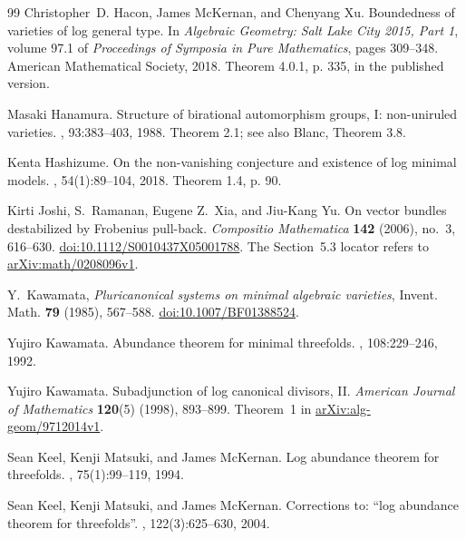 \begin{thebibliography}{99}
Christopher~D. Hacon, James McKernan, and Chenyang Xu.
\newblock Boundedness of varieties of log general type.
\newblock In {\em Algebraic Geometry: Salt Lake City 2015, Part 1}, volume 97.1 of {\em Proceedings of Symposia in Pure Mathematics}, pages 309--348. American Mathematical Society, 2018.
\newblock Theorem 4.0.1, p. 335, in the published version.

Masaki Hanamura.
\newblock Structure of birational automorphism groups, {I}: non-uniruled varieties.
, 93:383--403, 1988.
\newblock Theorem 2.1; see also Blanc, Theorem 3.8.

Kenta Hashizume.
\newblock On the non-vanishing conjecture and existence of log minimal models.
, 54(1):89--104, 2018.
\newblock Theorem 1.4, p. 90.

Kirti Joshi, S.~Ramanan, Eugene Z.~Xia, and Jiu-Kang Yu.
\newblock On vector bundles destabilized by Frobenius pull-back.
\newblock \emph{Compositio Mathematica} \textbf{142} (2006),
no.~3, 616--630.
\newblock \href{https://doi.org/10.1112/S0010437X05001788}{doi:10.1112/S0010437X05001788}.
\newblock The Section~5.3 locator refers to
\href{https://arxiv.org/abs/math/0208096v1}{arXiv:math/0208096v1}.

Y.~Kawamata,
\emph{Pluricanonical systems on minimal algebraic varieties},
Invent. Math. \textbf{79} (1985), 567--588.
\href{https://doi.org/10.1007/BF01388524}{doi:10.1007/BF01388524}.

Yujiro Kawamata.
\newblock Abundance theorem for minimal threefolds.
, 108:229--246, 1992.

Yujiro Kawamata.
\newblock Subadjunction of log canonical divisors, II.
\newblock \emph{American Journal of Mathematics} \textbf{120}(5) (1998), 893--899.
\newblock Theorem~1 in \href{https://arxiv.org/abs/alg-geom/9712014v1}{arXiv:alg-geom/9712014v1}.

Sean Keel, Kenji Matsuki, and James McKernan.
\newblock Log abundance theorem for threefolds.
, 75(1):99--119, 1994.

Sean Keel, Kenji Matsuki, and James McKernan.
\newblock Corrections to: ``log abundance theorem for threefolds''.
, 122(3):625--630, 2004.


\end{thebibliography}
